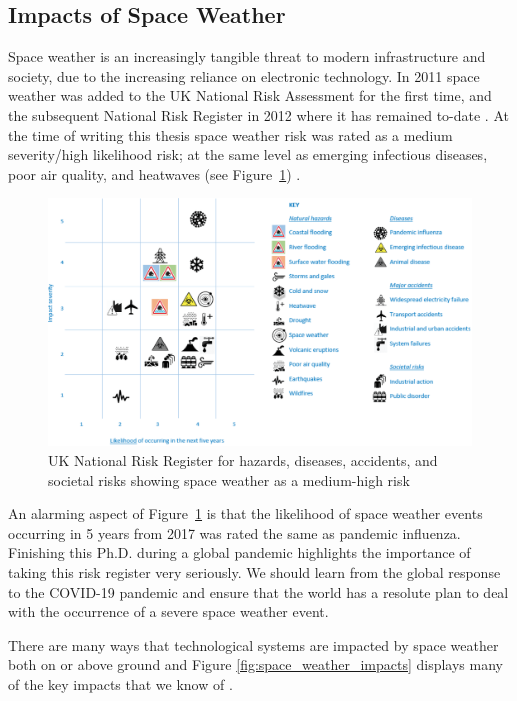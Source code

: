 \subsection{Impacts of Space Weather}
\label{sw_impacts}
Space weather is an increasingly tangible threat to modern infrastructure and society, due to the increasing reliance on electronic technology. In 2011 space weather was added to the UK National Risk Assessment for the first time, and the subsequent National Risk Register in 2012 \citep{bis_space_2015} where it has remained to-date \citep{hm_government_national_2020}. At the time of writing this thesis space weather risk was rated as a medium severity/high likelihood risk; at the same level as emerging infectious diseases, poor air quality, and heatwaves (see Figure~\ref{fig:UK_Risk_reg}) \citep{cabinet_office_national_2017}.

\begin{figure}[ht!]
	\centering
	\includegraphics[width=\columnwidth]{UK_risk_register.eps}
	\caption{UK National Risk Register for hazards, diseases, accidents, and societal risks showing space weather as a medium-high risk \citep{cabinet_office_national_2017}}
	\label{fig:UK_Risk_reg}
\end{figure}

An alarming aspect of Figure~\ref{fig:UK_Risk_reg} is that the likelihood of space weather events occurring in 5 years from 2017 was rated the same as pandemic influenza. Finishing this Ph.D. during a global pandemic highlights the importance of taking this risk register very seriously. We should learn from the global response to the COVID-19 pandemic and ensure that the world has a resolute plan to deal with the occurrence of a severe space weather event.

There are many ways that technological systems are impacted by space weather both on or above ground and Figure \ref{fig:space_weather_impacts} displays many of the key impacts that we know of \citep{beggan_ground_2018}. 


